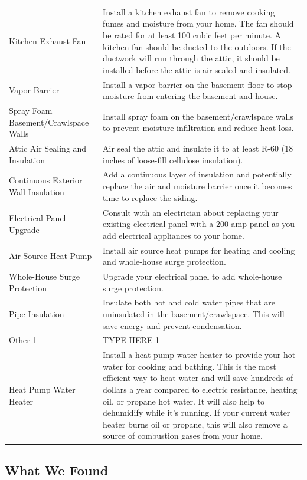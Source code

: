 \documentclass[
  letterpaper,
  DIV=11,
  numbers=noendperiod]{scrartcl}
\begin{document}
\begin{table}
\begin{tabular*}{1\linewidth}{@{\extracolsep{\fill}}>{\raggedright\arraybackslash}p{\dimexpr 150.00pt -2\tabcolsep-1.5\arrayrulewidth}>{\raggedright\arraybackslash}p{\dimexpr 337.50pt -2\tabcolsep-1.5\arrayrulewidth}}
Kitchen Exhaust Fan & Install a kitchen exhaust fan to remove cooking fumes and moisture from your home. The fan should be rated for at least 100 cubic feet per minute. A kitchen fan should be ducted to the outdoors. If the ductwork will run through the attic, it should be installed before the attic is air-sealed and insulated. \\ 
Vapor Barrier & Install a vapor barrier on the basement floor to stop moisture from entering the basement and house. \\ 
Spray Foam Basement/Crawlspace Walls & Install spray foam on the basement/crawlspace walls to prevent moisture infiltration and reduce heat loss. \\ 
Attic Air Sealing and Insulation & Air seal the attic and insulate it to at least R-60 (18 inches of loose-fill cellulose insulation). \\ 
Continuous Exterior Wall Insulation & Add a continuous layer of insulation and potentially replace the air and moisture barrier once it becomes time to replace the siding. \\ 
Electrical Panel Upgrade & Consult with an electrician about replacing your existing electrical panel with a 200 amp panel as you add electrical appliances to your home. \\ 
Air Source Heat Pump & Install air source heat pumps for heating and cooling and whole-house surge protection. \\ 
Whole-House Surge Protection & Upgrade your electrical panel to add whole-house surge protection. \\ 
Pipe Insulation & Insulate both hot and cold water pipes that are uninsulated in the basement/crawlspace. This will save energy and prevent condensation. \\ 
Other 1 & TYPE HERE 1 \\ 
Heat Pump Water Heater & Install a heat pump water heater to provide your hot water for cooking and bathing. This is the most efficient way to heat water and will save hundreds of dollars a year compared to electric resistance, heating oil, or propane hot water. It will also help to dehumidify while it's running. If your current water heater burns oil or propane, this will also remove a source of combustion gases from your home. \\ 
\bottomrule
\end{tabular*}
\end{table}

\newpage{}

\subsection{What We Found}\label{what-we-found}
\end{document}
